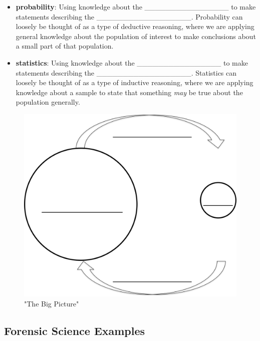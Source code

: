 \documentclass[]{book}
\providecommand{\tightlist}{%
  \setlength{\itemsep}{0pt}\setlength{\parskip}{0pt}}
\theoremstyle{definition}
\theoremstyle{definition}
\theoremstyle{remark}
\begin{document}
\vspace{.1in}

\begin{itemize}
\tightlist
\item
  \textbf{probability}: Using knowledge about the
  \_\_\_\_\_\_\_\_\_\_\_\_\_\_\_\_ to make statements describing the
  \_\_\_\_\_\_\_\_\_\_\_\_\_\_\_\_\_\_. Probability can loosely be
  thought of as a type of deductive reasoning, where we are applying
  general knowledge about the population of interest to make conclusions
  about a small part of that population.
\end{itemize}

\vspace{.1in}

\begin{itemize}
\tightlist
\item
  \textbf{statistics}: Using knowledge about the
  \_\_\_\_\_\_\_\_\_\_\_\_\_\_\_\_ to make statements describing the
  \_\_\_\_\_\_\_\_\_\_\_\_\_\_\_\_\_\_. Statistics can loosely be
  thought of as a type of inductive reasoning, where we are applying
  knowledge about a sample to state that something \emph{may} be true
  about the population generally.
\end{itemize}

\begin{figure}[h]

{\centering \includegraphics[width=.5\linewidth]{img/thebigpic} 

}

\caption{"The Big Picture"}\label{fig:thebigpic}
\end{figure}

\subsection{Forensic Science Examples}\label{forensic-science-examples}
\end{document}
